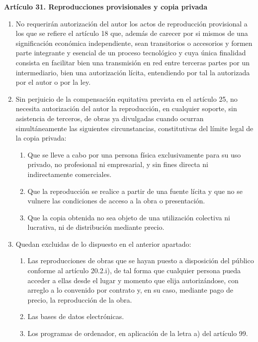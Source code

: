 \textbf{Artículo 31. Reproducciones provisionales y copia privada}
\begin{enumerate}[label=\textbf{\arabic*.}]
    \item No requerirán autorización del autor los actos de reproducción provisional a los que se refiere el artículo 18 que, además de carecer por si mismos de una significación económica independiente, sean transitorios o accesorios y formen parte integrante y esencial de un proceso tecnológico y cuya única finalidad consista en facilitar bien una transmisión en red entre terceras partes por un intermediario, bien una autorización lícita, entendiendo por tal la autorizada por el autor o por la ley.
    \item Sin perjuicio de la compensación equitativa prevista en el artículo 25, no necesita autorización del autor la reproducción, en cualquier soporte, sin asistencia de terceros, de obras ya divulgadas cuando ocurran simultáneamente las siguientes circunstancias, constitutivas del límite legal de la copia privada:
          \begin{enumerate}[label=\textbf{\alph*)}]
              \item Que se lleve a cabo por una persona física exclusivamente para su uso privado, no profesional ni empresarial, y sin fines directa ni indirectamente comerciales.
              \item Que la reproducción se realice a partir de una fuente lícita y que no se vulnere las condiciones de acceso a la obra o presentación.
              \item Que la copia obtenida no sea objeto de una utilización colectiva ni lucrativa, ni de distribución mediante precio.
          \end{enumerate}
    \item Quedan excluidas de lo dispuesto en el anterior apartado:
          \begin{enumerate}[label=\textbf{\alph*)}]
              \item Las reproducciones de obras que se hayan puesto a disposición del público conforme al artículo 20.2.i), de tal forma que cualquier persona pueda acceder a ellas desde el lugar y momento que elija autorizándose, con arreglo a lo convenido por contrato y, en su caso, mediante pago de precio, la reproducción de la obra.
              \item Las bases de datos electrónicas.
              \item Los programas de ordenador, en aplicación de la letra a) del artículo 99.
          \end{enumerate}
\end{enumerate}

